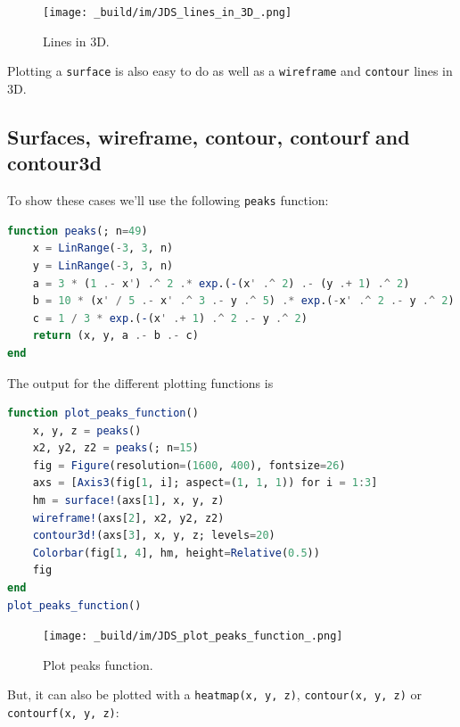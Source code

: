 \documentclass[
  notoc %
]{tufte-book}
\newcommand{\passthrough}[1]{#1}
\begin{document}
\begin{figure}
\hypertarget{fig:lines_in_3D}{%
\centering
\texttt{[image: \_build/im/JDS\_lines\_in\_3D\_.png]}
\caption{Lines in 3D.}\label{fig:lines_in_3D}
}
\end{figure}

Plotting a \passthrough{\lstinline!surface!} is also easy to do as well
as a \passthrough{\lstinline!wireframe!} and
\passthrough{\lstinline!contour!} lines in 3D.

\hypertarget{surfaces-wireframe-contour-contourf-and-contour3d}{%
\subsection{Surfaces, wireframe, contour, contourf and
contour3d}\label{surfaces-wireframe-contour-contourf-and-contour3d}}

To show these cases we'll use the following
\passthrough{\lstinline!peaks!} function:

\begin{lstlisting}[language=Julia]
function peaks(; n=49)
    x = LinRange(-3, 3, n)
    y = LinRange(-3, 3, n)
    a = 3 * (1 .- x') .^ 2 .* exp.(-(x' .^ 2) .- (y .+ 1) .^ 2)
    b = 10 * (x' / 5 .- x' .^ 3 .- y .^ 5) .* exp.(-x' .^ 2 .- y .^ 2)
    c = 1 / 3 * exp.(-(x' .+ 1) .^ 2 .- y .^ 2)
    return (x, y, a .- b .- c)
end
\end{lstlisting}

The output for the different plotting functions is

\begin{lstlisting}[language=Julia]
function plot_peaks_function()
    x, y, z = peaks()
    x2, y2, z2 = peaks(; n=15)
    fig = Figure(resolution=(1600, 400), fontsize=26)
    axs = [Axis3(fig[1, i]; aspect=(1, 1, 1)) for i = 1:3]
    hm = surface!(axs[1], x, y, z)
    wireframe!(axs[2], x2, y2, z2)
    contour3d!(axs[3], x, y, z; levels=20)
    Colorbar(fig[1, 4], hm, height=Relative(0.5))
    fig
end
plot_peaks_function()
\end{lstlisting}

\begin{figure}
\hypertarget{fig:plot_peaks_function}{%
\centering
\texttt{[image: \_build/im/JDS\_plot\_peaks\_function\_.png]}
\caption{Plot peaks function.}\label{fig:plot_peaks_function}
}
\end{figure}

But, it can also be plotted with a
\passthrough{\lstinline!heatmap(x, y, z)!},
\passthrough{\lstinline!contour(x, y, z)!} or
\passthrough{\lstinline!contourf(x, y, z)!}:
\end{document}
